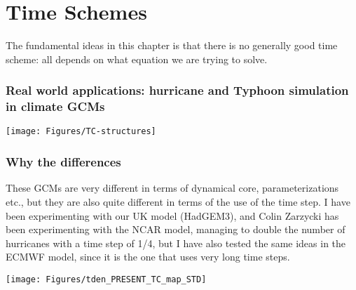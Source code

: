 \chapter{Time Schemes}

The fundamental ideas in this chapter is that there is no generally good time scheme: all depends on what equation we are trying to solve.


\subsection{Real world applications: hurricane and Typhoon simulation in climate GCMs}

\begin{center}	
	\texttt{[image: Figures/TC-structures]}
\end{center}

\subsection{Why the differences}
These GCMs are very different in terms of dynamical core, parameterizations etc., but they are also quite different in terms of the use of the time step. I have been experimenting with our UK model (HadGEM3), and Colin Zarzycki has been experimenting with the NCAR model, managing to double the number of hurricanes with a time step of 1/4, but I have also tested the same ideas in the ECMWF model, since it is the one that uses very long time steps.
\begin{center}	
	\texttt{[image: Figures/tden\_PRESENT\_TC\_map\_STD]}
\end{center}